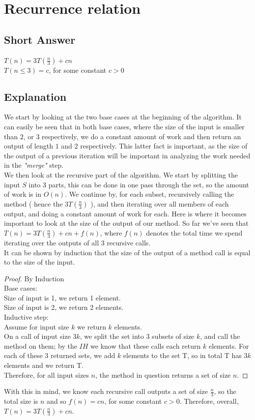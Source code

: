 \documentclass[a4paper,11pt]{article}
\begin{document}
	\section{Recurrence relation}
	\subsection{Short Answer}
	\begin{center}
		$T(n) = 3T(\frac{n}{3}) + cn$\\
		$T(n \leq 3) = c$, for some constant $c > 0$\\
	\end{center}
	\subsection{Explanation}
		We start by looking at the two base cases at the beginning of the algorithm. It can easily be seen that in both base cases, where the size of the input is smaller than $2$, or $3$ respectively, we do a constant amount of work and then return an output of length $1$ and $2$ respectively. This latter fact is important, as the size of the output of a previous iteration will be important in analyzing the work needed in the \textit{"merge"} step.\\
		We then look at the recursive part of the algorithm. We start by splitting the input $S$ into 3 parts, this can be done in one pass through the set, so the amount of work is in $O(n)$. We continue by, for each subset, recursively calling the method ( hence the $3T(\frac{n}{3})$ ), and then iterating over all members of each output, and doing a constant amount of work for each. Here is where it becomes important to look at the size of the output of our method. So far we've seen that $T(n) = 3T(\frac{n}{3}) + cn + f(n)$, where $f(n)$ denotes the total time we spend iterating over the outputs of all 3 recursive calls.\\
		It can be shown by induction that the size of the output of a method call is equal to the size of the input.
		\begin{proof}
			By Induction\\
			Base cases:\\
			Size of input is 1, we return 1 element.\\
			Size of input is 2, we return 2 elements.\\
			Inductive step:\\
			Assume for input size $k$ we return $k$ elements.\\
			On a call of input size $3k$, we split the set into $3$ subsets of size $k$, and call the method on them; by the $IH$ we know that these calls each return $k$ elements. For each of these $3$ returned sets, we add $k$ elements to the set T, so in total T has $3k$ elements and we return T.\\
			Therefore, for all input sizes $n$, the method in question returns a set of size $n$.
		\end{proof}
		With this in mind, we know each recursive call outputs a set of size $\frac{n}{3}$, so the total size is $n$ and so $f(n) = cn$, for some constant $c >0$. Therefore, overall, $T(n) = 3T(\frac{n}{3}) + cn$.
\end{document}

